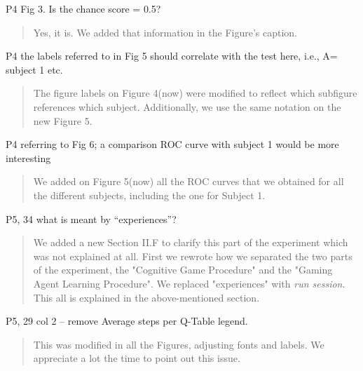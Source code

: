 \documentclass[journal,onecolumn,12pt]{IEEEtran}
\begin{document}
P4 Fig 3. Is the chance score = 0.5?

\vspace{2em}
\begin{quotation}
{\color{blue}
Yes, it is.  We added that information in the Figure's caption.
}
\end{quotation}
\vspace{2em}

P4 the labels referred to in Fig 5 should correlate with the test here, i.e., A= subject 1 etc.

\vspace{2em}
\begin{quotation}
{\color{blue}
The figure labels on Figure 4(now) were modified to reflect which subfigure references which subject.  Additionally, we use the same notation on the new Figure 5.
} 
\end{quotation}
\vspace{2em}

P4 referring to Fig 6; a comparison ROC curve with subject 1 would be more interesting

\vspace{2em}
\begin{quotation}
{\color{blue}
We added on Figure 5(now) all the ROC curves that we obtained for all the different subjects, including the one for Subject 1.  
}
\end{quotation}
\vspace{2em}


P5, 34 what is meant by “experiences”?

\vspace{2em}
\begin{quotation}
{\color{blue}
We added a new Section II.F to clarify this part of the experiment which was not explained at all.  First we rewrote how we separated the two parts of the experiment, the "Cognitive Game Procedure" and the "Gaming Agent Learning Procedure".   We replaced "experiences" with \textit{run session}.  This all is explained in the above-mentioned section.
}
\end{quotation}
\vspace{2em}

P5, 29 col 2 – remove Average steps per Q-Table legend.

\vspace{2em}
\begin{quotation}
{\color{blue}
This was modified in all the Figures, adjusting fonts and labels.  We appreciate a lot the time to point out this issue.
}
\end{quotation}
\vspace{2em}
\end{document}
